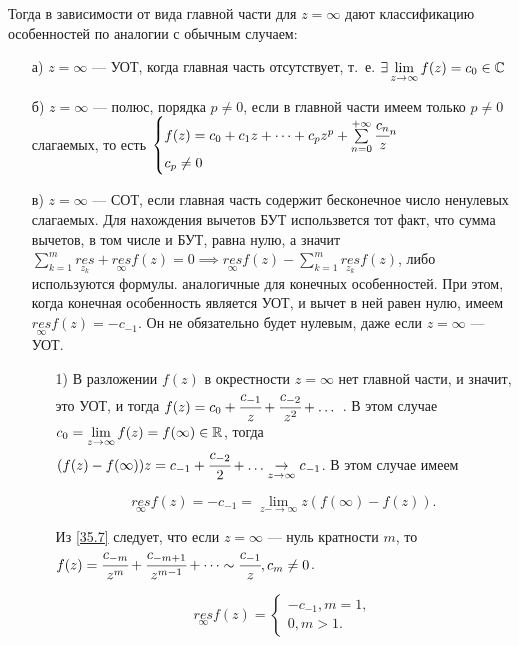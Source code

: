 \documentclass[../../main.tex]{subfiles}
\begin{document}
	 Тогда в зависимости от вида главной части для $z=\infty$ дают классификацию особенностей по аналогии с обычным случаем:
	 \begin{itemize}
	 	\item[а)] $z=\infty$ --- УОТ, когда главная часть отсутствует, т.~е.
	 	$\exists\lim\limits_{z\rightarrow \infty} f(z)=c_0\in \mathbb{C}$
	 	\item[б)] $z=\infty$ --- полюс, порядка $p\neq 0$, если в 
	 	главной части имеем только $p\neq 0$ слагаемых, то есть 
	 	$
	 	\begin{cases}
	 	f(z)=c_0+c_1z+\dots+c_pz^p+\sum\limits_{n=0}^{+\infty}\cfrac{c_n}
	 	z^n\\
	c_p\neq 0
	 	\end{cases}
	 	$ 
	 \item[в)] $z=\infty$ --- СОТ, если главная часть содержит бесконечное число ненулевых слагаемых. Для нахождения вычетов БУТ использвется тот факт, что сумма вычетов, в том числе и БУТ, равна нулю, а значит 
	 $\sum\limits_{k=1}^m\underset{z_k}{res}+\underset{\infty}{res}f(z)=0 \implies\underset{\infty}{res}f(z)-\sum\limits_{k=1}^m \underset{z_k}{res}f(z)$, либо используются формулы. аналогичные для конечных особенностей. При этом, когда конечная особенность является УОТ, и вычет в ней равен нулю, имеем 	$\underset{\infty}{res}f(z)=-c_{-1}.$ Он не обязательно будет нулевым, даже если $z=\infty$ --- УОТ.
	 
	 \begin{itemize}
	 	\item[1)] В разложении $f(z)$ в окрестности $z=\infty$ нет главной части, и значит, это УОТ, и тогда $f(z)=c_0+\cfrac{c_{-1}}{z}+\cfrac{c_{-2}}{z^2}+ \dots$ . В этом случае 
	 	$c_0=\lim\limits_{z\rightarrow \infty}f(z)=f(\infty)\in \mathbb{R}$, тогда 
	 	$(f(z)-f(\infty))z=c_{-1}+\cfrac{c_{-2}}{2}+ \dots\underset{z\rightarrow\infty}{\rightarrow}c_{-1}$. В этом случае имеем 	
	 	
	 	\begin{equation}\label{35.7}
	 	\underset{\infty}{res}f(z)=-c_{-1}=\lim\limits_{z-\rightarrow\infty}z(f(\infty)-f(z)).
	 	\end{equation}
	 	
	 	Из \ref{35.7} следует, что если $z=\infty$ --- нуль кратности $m$, то $f(z)=\cfrac{c_{-m}}{z^m}+ \cfrac{c_{-m+1}}{z^{m-1}}+\dots\sim \cfrac{c_{-1}}{z}, c_m\neq0$.
	 
	 	\[
	 	\underset{\infty}{res}f(z)=
	 	\begin{cases}
	 		-c_{-1}, m=1,\\
	 		0, m>1.
	 	\end{cases}
	 	\]
	 	

\end{itemize}
\end{itemize}
\end{document}

